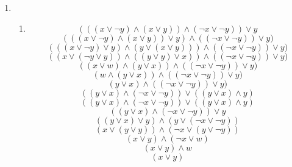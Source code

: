 \documentclass[a4paper]{article}
\begin{document}
\begin{enumerate}
		\item
		\begin{enumerate}
			\item
			\begin{equation*}
				(((x \lor \lnot y) \land (x \lor y)) \land (\lnot x \lor \lnot y)) \lor y
			\end{equation*}
			\begin{equation*}
				(((x \lor \lnot y) \land (x \lor y)) \lor y) \land ((\lnot x \lor \lnot y)) \lor y)
			\end{equation*}
			\begin{equation*}
				(((x \lor \lnot y) \lor y) \land (y \lor (x \lor y))) \land ((\lnot x \lor \lnot y)) \lor y)
			\end{equation*}
			\begin{equation*}
				((x \lor (\lnot y \lor y)) \land ((y \lor y) \lor x)) \land ((\lnot x \lor \lnot y)) \lor y)
			\end{equation*}
			\begin{equation*}
				((x \lor w) \land (y \lor x)) \land ((\lnot x \lor \lnot y)) \lor y)
			\end{equation*}
			\begin{equation*}
				(w \land (y \lor x)) \land ((\lnot x \lor \lnot y)) \lor y)
			\end{equation*}
			\begin{equation*}
				(y \lor x) \land ((\lnot x \lor \lnot y)) \lor y)
			\end{equation*}
			\begin{equation*}
				((y \lor x) \land (\lnot x \lor \lnot y)) \lor ((y \lor x) \land y)
			\end{equation*}
			\begin{equation*}
				((y \lor x) \land (\lnot x \lor \lnot y)) \lor ((y \lor x) \land y)
			\end{equation*}
			\begin{equation*}
				((y \lor x) \land (\lnot x \lor \lnot y)) \lor y
			\end{equation*}
			\begin{equation*}
				((y \lor x) \lor y) \land (y \lor (\lnot x \lor \lnot y))
			\end{equation*}
			\begin{equation*}
				(x \lor (y \lor y)) \land (\lnot x \lor (y \lor \lnot y))
			\end{equation*}
			\begin{equation*}
				(x \lor y) \land (\lnot x \lor w)
			\end{equation*}
			\begin{equation*}
				(x \lor y) \land w
			\end{equation*}
			\begin{equation*}
				(x \lor y)
			\end{equation*}
			

\end{enumerate}
\end{enumerate}
\end{document}
